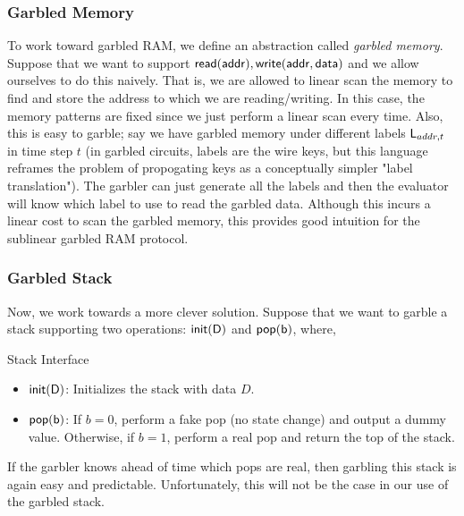 \subsubsection{Garbled Memory}
To work toward garbled RAM, we define an abstraction called \textit{ garbled memory}.
Suppose that we want to support $\mathsf{read(addr),write(addr,data)}$ and we allow ourselves to do this naively. That is, we are allowed to linear scan the memory to find and store the address to which we are reading/writing. 
In this case, the memory patterns are fixed since we just perform a linear scan every time. Also, this is easy to garble; say we have garbled memory under different labels $\mathsf{L}_{addr,t}$ in time step $t$ (in garbled circuits, labels are the wire keys, but this language reframes the problem of propogating keys as a conceptually simpler "label translation").
The garbler can just generate all the labels and then the evaluator will know which label to use to read the garbled data.
Although this incurs a linear cost to scan the garbled memory, this provides good intuition for the sublinear garbled RAM protocol.
\subsubsection{Garbled Stack}
Now, we work towards a more clever solution. Suppose that we want to garble a stack supporting two operations: $\mathsf{init(D)}$ and $\mathsf{pop(b)}$, where, 
\begin{mdframed}[innertopmargin=5pt, skipabove=\topskip, skipbelow=\topskip,align=left,nobreak=true]
Stack Interface
\begin{itemize}
    \item $\mathsf{init(D)}$: Initializes the stack with data $D$.
    \item $\mathsf{pop(b)}$: If $b = 0$, perform a fake pop (no state change) and output a dummy value. Otherwise, if $b = 1$, perform a real pop and return the top of the stack.
\end{itemize}
\end{mdframed}
If the garbler knows ahead of time which pops are real, then garbling this stack is again easy and predictable. Unfortunately, this will not be the case in our use of the garbled stack.


